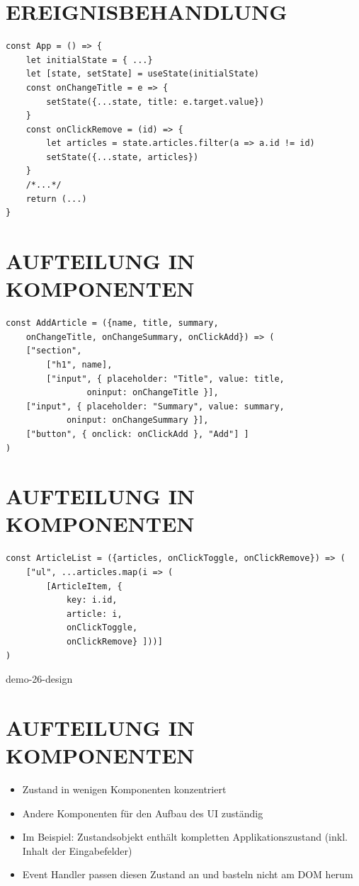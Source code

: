 \documentclass[10pt]{article}
\begin{document}
\section*{EREIGNISBEHANDLUNG}
\begin{verbatim}
const App = () => {
    let initialState = { ...}
    let [state, setState] = useState(initialState)
    const onChangeTitle = e => {
        setState({...state, title: e.target.value})
    }
    const onClickRemove = (id) => {
        let articles = state.articles.filter(a => a.id != id)
        setState({...state, articles})
    }
    /*...*/
    return (...)
}
\end{verbatim}

\section*{AUFTEILUNG IN KOMPONENTEN}
\begin{verbatim}
const AddArticle = ({name, title, summary,
    onChangeTitle, onChangeSummary, onClickAdd}) => (
    ["section",
        ["h1", name],
        ["input", { placeholder: "Title", value: title,
                oninput: onChangeTitle }],
    ["input", { placeholder: "Summary", value: summary,
            oninput: onChangeSummary }],
    ["button", { onclick: onClickAdd }, "Add"] ]
)
\end{verbatim}

\section*{AUFTEILUNG IN KOMPONENTEN}
\begin{verbatim}
const ArticleList = ({articles, onClickToggle, onClickRemove}) => (
    ["ul", ...articles.map(i => (
        [ArticleItem, {
            key: i.id,
            article: i,
            onClickToggle,
            onClickRemove} ]))]
)
\end{verbatim}

demo-26-design

\section*{AUFTEILUNG IN KOMPONENTEN}
\begin{itemize}
  \item Zustand in wenigen Komponenten konzentriert
  \item Andere Komponenten für den Aufbau des UI zuständig
  \item Im Beispiel: Zustandsobjekt enthält kompletten Applikationszustand (inkl. Inhalt der Eingabefelder)
  \item Event Handler passen diesen Zustand an und basteln nicht am DOM herum
\end{itemize}
\end{document}
